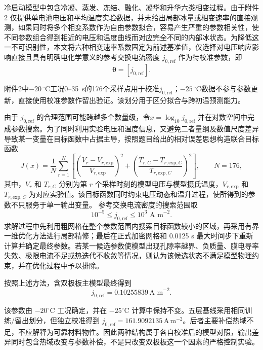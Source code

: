 \documentclass[bwprint]{gmcmthesis}
\numberwithin{equation}{section}
\numberwithin{figure}{section}
\begin{document}
冷启动模型中包含冷凝、蒸发、冻结、融化、凝华和升华六类相变过程。由于附件 2 仅提供单电池电压和平均温度实验数据，并未给出局部冰量或相变速率的直接观测，如果同时将多个相变系数作为自由参数拟合，容易产生严重的参数相关性，使不同参数组合得到相近的电压和温度曲线而对应完全不同的内部冰状态。为降低这一不可识别性，本文将六种相变速率系数固定为前述基准值，仅选择对电压响应影响直接且具有明确电化学意义的参考交换电流密度 \(j_{0,\text{ref}}\) 作为待校准参数，即
\begin{equation}
\boldsymbol{\theta} = [j_{0,\text{ref}}]. \label{eq:src:4-94}
\end{equation}


附件2中$-20\,^\circ\mathrm C$工况0--35~s的176个采样点用于校准$j_{0,\mathrm{ref}}$；$-25\,^\circ\mathrm C$数据不参与参数更新，直接使用校准参数作留出验证。该划分用于区分拟合与跨初温预测能力。


由于 \(j_{0,\text{ref}}\) 的合理范围可能跨越多个数量级，令$x = \log_{10} j_{0,\text{ref}} $
并在对数空间中完成参数搜索。为了同时利用实验电压和温度信息，又避免二者量纲及数值尺度差异导致某一变量在目标函数中占据主导，按照题目给出的相对误差思想构造联合目标函数
\begin{equation}
J(x) = \frac{1}{N} \sum_{r=1}^N \left[ \left( \frac{V_r - V_{r,\text{exp}}}{V_{r,\text{exp}}} \right)^2 + \left( \frac{T_{r,C} - T_{r,\text{exp},C}}{T_{r,\text{exp},C}} \right)^2 \right], \qquad N = 176, \label{eq:src:4-95}
\end{equation}
其中，\(V_r\) 和 \(T_{r,C}\) 分别为第 \(r\) 个采样时刻的模型电压与模型摄氏温度，\(V_{r,\text{exp}}\) 和 \(T_{r,\text{exp},C}\) 为对应实验值。该目标函数同时约束电压动态和温升过程，使所得到的参数不只服务于单一输出变量。
参考交换电流密度的搜索范围取
\[
10^{-5} \leq j_{0,\text{ref}} \leq 10^3 \text{ A m}^{-2}.
\]
求解过程中先利用粗网格在整个参数范围内搜索目标函数较小的区域，再采用有界一维优化方法进行局部精修；最后在正式加密网格和 0.0125 s 最大时间步下重新计算并确定最终参数。若某一候选参数使模型出现孔隙率越界、负质量、膜电导率失效、极限电流不足或热迭代不收敛等情况，则认为该候选状态不满足模型物理约束，并在优化过程中予以排除。


 按照上述方法，含双极板主模型最终得到
\begin{equation}
j_{0,\text{ref}} = 0.10255839 \, \text{A m}^{-2}. \label{eq:src:4-96}
\end{equation}

该参数由 $-20^\circ\mathrm C$ 工况确定，并在 $-25^\circ\mathrm C$ 计算中保持不变。五层基线采用相同训练/留出划分，但独立校准得到 $j_{0,\mathrm{ref}}=161.9092135\,\mathrm{A\,m^{-2}}$。后者主要补偿热域不足，不应解释为可靠材料物性。因此两种结构属于各自校准后的模型对照，输出差异同时包含热域改变与参数补偿，不是只改变双极板这一个因素的严格控制实验。
\end{document}
